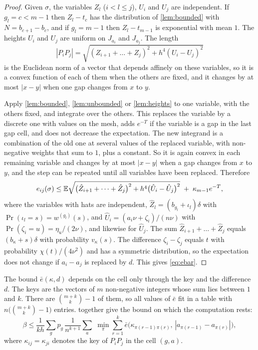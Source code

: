 \begin{proof}
Given $\sigma$, the variables $Z_l$ ($i<l\le j$), $U_i$ and $U_j$ are independent. If $g_l=c<m-1$ then $Z_l-t_c$ has the distribution of \cref{lem:bounded} with $N=b_{c+1}-b_c$, and if $g_l=m-1$ then $Z_l-t_{m-1}$ is exponential with mean $1$. The heights $U_i$ and $U_j$ are uniform on $J_{a_i}$ and $J_{a_j}$. The length
\[
|P_iP_j|=\sqrt{(Z_{i+1}+\dots+Z_j)^2+h^4(U_i-U_j)^2}
\]
is the Euclidean norm of a vector that depends affinely on these variables, so it is a convex function of each of them when the others are fixed, and it changes by at most $|x-y|$ when one gap changes from $x$ to $y$.

Apply \cref{lem:bounded}, \ref{lem:unbounded} or \ref{lem:heights} to one variable, with the others fixed, and integrate over the others. This replaces the variable by a discrete one with values on the mesh, adds $e^{-T}$ if the variable is a gap in the last gap cell, and does not decrease the expectation. The new integrand is a combination of the old one at several values of the replaced variable, with non-negative weights that sum to $1$, plus a constant. So it is again convex in each remaining variable and changes by at most $|x-y|$ when a gap changes from $x$ to $y$, and the step can be repeated until all variables have been replaced. Therefore
\[
e_{ij}(\sigma)\le\mathbb{E}\sqrt{\bigl(\hat Z_{i+1}+\dots+\hat Z_j\bigr)^2+h^4\bigl(\hat U_i-\hat U_j\bigr)^2}\;+\;\kappa_{m-1}e^{-T},
\]
where the variables with hats are independent, $\hat Z_l=(b_{g_l}+\iota_l)\delta$ with $\Pr(\iota_l=s)=w^{(g_l)}(s)$, and $\hat U_i=(a_i\nu+\zeta_i)/(n\nu)$ with $\Pr(\zeta_i=u)=\eta_u/(2\nu)$, and likewise for $\hat U_j$. The sum $\hat Z_{i+1}+\dots+\hat Z_j$ equals $(b_\kappa+s)\delta$ with probability $v_\kappa(s)$. The difference $\zeta_i-\zeta_j$ equals $t$ with probability $\chi(t)/(4\nu^2)$ and has a symmetric distribution, so the expectation does not change if $a_i-a_j$ is replaced by $d$. This gives \eqref{eq:ebar}.
\end{proof}

The bound $\bar e(\kappa,d)$ depends on the cell only through the key and the difference $d$. The keys are the vectors of $m$ non-negative integers whose sum lies between $1$ and $k$. There are $\binom{m+k}{k}-1$ of them, so all values of $\bar e$ fit in a table with $n\bigl(\binom{m+k}{k}-1\bigr)$ entries.  together give the bound on which the computation rests:
\begin{equation}\label{eq:realbound}
\beta\le\frac{1}{kh}\sum_{g}p_g\,\frac{1}{n^{k+1}}\sum_{a}\;\min_\pi\sum_{r=1}^{k}\bar e\bigl(\kappa_{\pi(r-1)\pi(r)},\,|a_{\pi(r-1)}-a_{\pi(r)}|\bigr),
\end{equation}
where $\kappa_{ij}=\kappa_{ji}$ denotes the key of $P_iP_j$ in the cell $(g,a)$.

